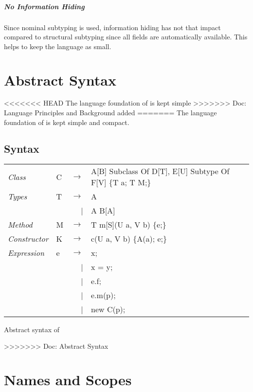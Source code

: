 \paragraph{No Information Hiding}
Since nominal subtyping is used, information hiding has not that impact
compared to structural subtyping since all fields are automatically
available. This helps to keep the language as small.

\chapter{Abstract Syntax}
<<<<<<< HEAD
The language foundation of \ooplss is kept simple
>>>>>>> Doc: Language Principles and Background added
=======
The language foundation of \ooplss is kept simple and compact. 

\section{Syntax}
\begin{listing}
	\begin{tabular}[H]{llrll}
		\emph{Class}					& C	& $\longrightarrow$ 		& A[B] Subclass Of D[T], E[U] Subtype Of F[V] \{T a; T M;\} \\
		\emph{Types}					& T & $\longrightarrow$ 		& A \\
													&   & 									 | & A \match B[A] \\
		\emph{Method}					& M	& $\longrightarrow$ 		& T m[S](U a, V b) \{e;\} \\
		\emph{Constructor}		& K	& $\longrightarrow$ 		& c(U a, V b) \{A(a); e;\} \\
		\emph{Expression}			& e & $\longrightarrow$ 		& x; \\
													&   & 									 | & x = y; \\
													&   & 									 | & e.f; \\
													&   & 									 | & e.m(p); \\
													&   & 									 | & new C(p); \\
	\end{tabular}
\caption{Abstract syntax of \ooplss}
\label{lst:abstractSyntax}
\end{listing}

>>>>>>> Doc: Abstract Syntax

\chapter{Names and Scopes}

